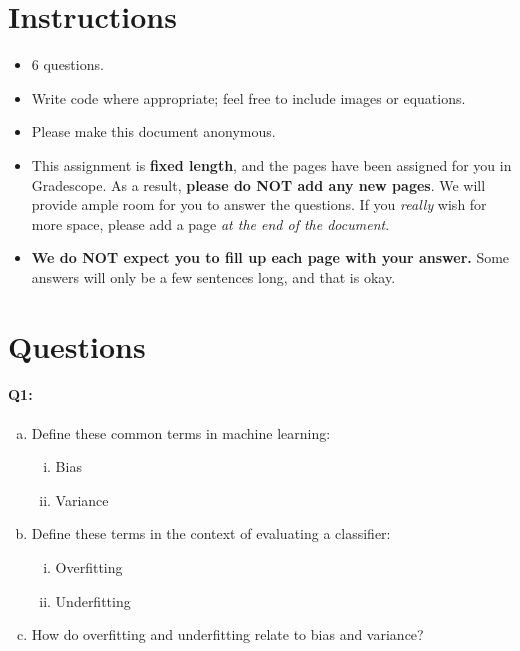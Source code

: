 \maketitle
\thispagestyle{fancy}
\vspace{-3cm}

\section*{Instructions}
\begin{itemize}
    \item 6 questions.
    \item Write code where appropriate; feel free to include images or equations.
    \item Please make this document anonymous.
    \item This assignment is \textbf{fixed length}, and the pages have been assigned for you in Gradescope. As a result, \textbf{please do NOT add any new pages}. We will provide ample room for you to answer the questions. If you \emph{really} wish for more space, please add a page \emph{at the end of the document}.
    \item \textbf{We do NOT expect you to fill up each page with your answer.} Some answers will only be a few sentences long, and that is okay.
\end{itemize}

\section*{Questions}


\paragraph{Q1:}

\begin{enumerate} [(a)]
    \item Define these common terms in machine learning:
          \begin{enumerate} [(i)]
              \item Bias
              \item Variance
          \end{enumerate}
    \item Define these terms in the context of evaluating a classifier:
          \begin{enumerate} [(i)]
              \item Overfitting
              \item Underfitting
          \end{enumerate}
    \item How do overfitting and underfitting relate to bias and variance?
\end{enumerate}

